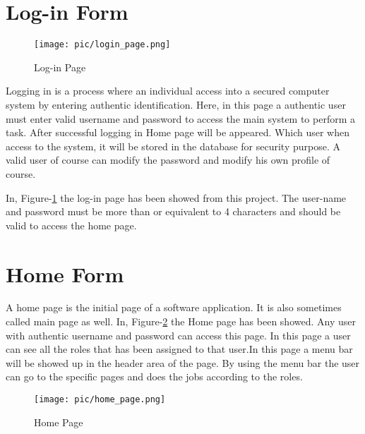 \documentclass[12pt]{report} %
\begin{document}
\section{Log-in Form}

\begin{figure}[h]
	\begin{center}
	\texttt{[image: pic/login\_page.png]}
	\end{center}
	\caption{Log-in Page}
	\label{fig:login_page}
\end{figure}


Logging in is a process where an individual access into a secured computer system by entering authentic identification. Here, in this page a authentic user must enter valid username and password to access the main system to perform a task. After successful logging in Home page will be appeared. Which user when access to the system, it will be stored in the database for security purpose. A valid user of course can modify the password and modify his own profile of course.


In, Figure-\ref{fig:login_page} the log-in page has been showed from this project. The user-name and password must be more than or equivalent to 4 characters and should be valid to access the home page. 





\section{Home Form}

A home page  is the initial page of a software application. It is also sometimes called main page as well. In, Figure-\ref{fig:home_page} the Home page has been showed. Any user with authentic username and password can access this page. In this page a user can see all the roles that has been assigned to that user.In this page a menu bar will be showed up in the header area of the page. By using the menu bar the user can go to the specific pages and does the jobs according to the roles.

\clearpage



\begin{figure}[h]
		\begin{center}
			\texttt{[image: pic/home\_page.png]}
		\end{center}
	\caption{Home Page}
	\label{fig:home_page}
\end{figure}
\end{document}
